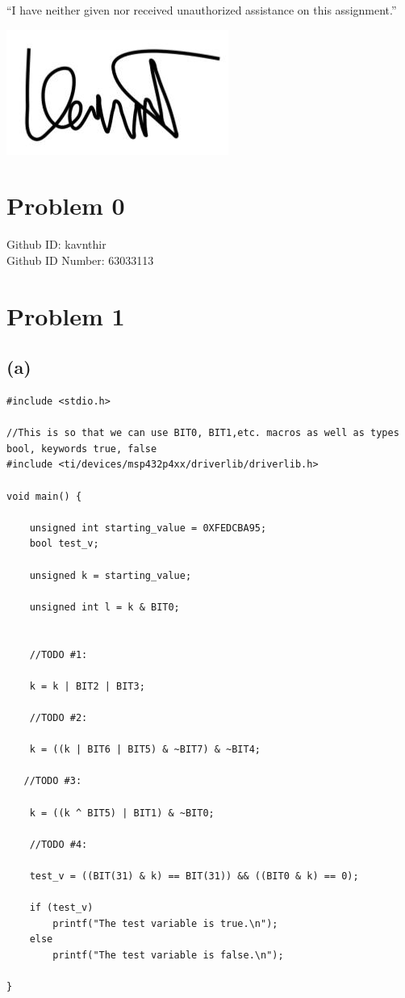 \documentclass{article}
\begin{document}
\begin{center}
    “I have neither given nor received unauthorized assistance on this assignment.”
    
    \includegraphics[width = .1\textwidth]{Signature.jpg}
\end{center}
\section*{Problem 0}
\begin{center}
    Github ID: kavnthir\\
    Github ID Number: 63033113
\end{center} 
\section*{Problem 1}
\subsection*{(a)}
\begin{center}
        \lstset{language=C}
        \lstset{frame=lines}
        \lstset{basicstyle=\footnotesize}
        \begin{lstlisting}
#include <stdio.h>

//This is so that we can use BIT0, BIT1,etc. macros as well as types bool, keywords true, false
#include <ti/devices/msp432p4xx/driverlib/driverlib.h>

void main() {

    unsigned int starting_value = 0XFEDCBA95;
    bool test_v;

    unsigned k = starting_value;

    unsigned int l = k & BIT0;


    //TODO #1:

    k = k | BIT2 | BIT3;

    //TODO #2: 

    k = ((k | BIT6 | BIT5) & ~BIT7) & ~BIT4;

   //TODO #3: 

    k = ((k ^ BIT5) | BIT1) & ~BIT0;

    //TODO #4: 
   
    test_v = ((BIT(31) & k) == BIT(31)) && ((BIT0 & k) == 0);

    if (test_v)
        printf("The test variable is true.\n");
    else
        printf("The test variable is false.\n");

}
        \end{lstlisting}
\end{center}
\newpage
\end{document}
